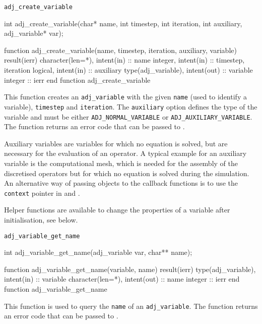 
\begin{boxwithtitle}{\texttt{adj_create_variable}}
\begin{minipage}{\columnwidth}
\begin{ccode}
  int adj_create_variable(char* name, int timestep, int iteration, int auxiliary, 
                          adj_variable* var);
\end{ccode}
\begin{fortrancode}
  function adj_create_variable(name, timestep, iteration, auxiliary, variable) 
           result(ierr)
    character(len=*), intent(in) :: name
    integer, intent(in) :: timestep, iteration
    logical, intent(in) :: auxiliary
    type(adj_variable), intent(out) :: variable
    integer :: ierr
  end function adj_create_variable
\end{fortrancode}
\end{minipage}
\end{boxwithtitle}

This function creates an \texttt{adj_variable} with the given \texttt{name} (used to identify a variable), \texttt{timestep} and \texttt{iteration}.
The \texttt{auxiliary} option defines the type of the variable and must be either \texttt{ADJ_NORMAL_VARIABLE} or \texttt{ADJ_AUXILIARY_VARIABLE}.
The function returns an error code that can be passed to .

Auxiliary variables are variables for which no equation is solved, but are necessary for the evaluation of an operator.
A typical example for an auxiliary variable is the computational mesh, which is needed for the assembly of the discretised operators but for which no equation is solved during the simulation.
An alternative way of passing objects to the callback functions is to use the \texttt{context} pointer in  and .

Helper functions are available to change the properties of a variable after initialisation, see below. 



\begin{boxwithtitle}{\texttt{adj_variable_get_name}}
\begin{minipage}{\columnwidth}
\begin{ccode}
  int adj_variable_get_name(adj_variable var, char** name);
\end{ccode}
\begin{fortrancode}
  function adj_variable_get_name(variable, name) result(ierr)
    type(adj_variable), intent(in) :: variable
    character(len=*), intent(out) :: name
    integer :: ierr
  end function adj_variable_get_name
\end{fortrancode}
\end{minipage}
\end{boxwithtitle}
This function is used to query the \texttt{name} of an \texttt{adj_variable}.
The function returns an error code that can be passed to .

